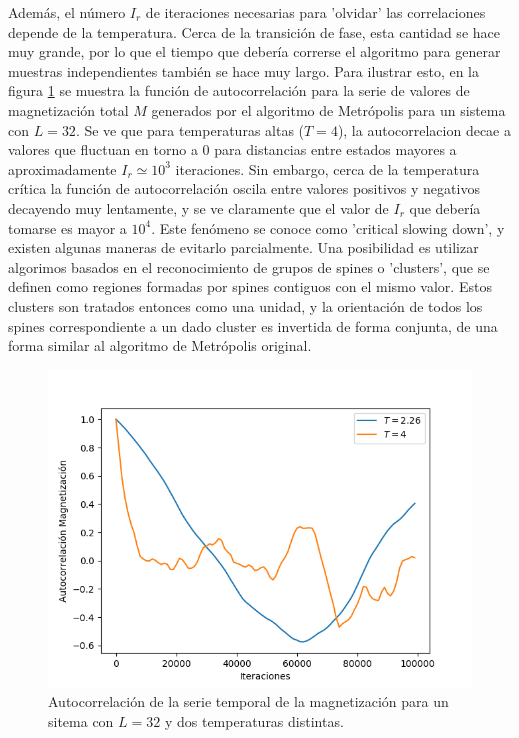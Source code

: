 \documentclass[a4paper,11pt,oneside]{article}
\begin{document}
Además, el número $I_r$ de iteraciones necesarias para 'olvidar' las
correlaciones depende de la temperatura. Cerca de la transición de fase, esta
cantidad se hace muy grande, por lo que el tiempo que debería correrse el
algoritmo para generar muestras independientes también se hace muy largo.
Para ilustrar esto, en la figura
\ref{fig:autocorr_mag} se muestra la función de autocorrelación para la serie
de valores de magnetización total $M$ generados por el algoritmo de Metrópolis
para un sistema con $L=32$.
Se ve que para temperaturas altas ($T=4$), la autocorrelacion decae a valores que
fluctuan en torno a $0$ para distancias entre estados mayores a aproximadamente
$I_r \simeq 10^3$ iteraciones. Sin embargo, 
cerca de la temperatura crítica la función de
autocorrelación oscila entre valores positivos y negativos decayendo muy
lentamente, y se ve claramente que el valor de $I_r$ que debería tomarse 
es mayor a $10^4$. Este fenómeno se conoce como 'critical slowing down', y
existen algunas maneras de evitarlo parcialmente. Una posibilidad es utilizar
algorimos basados en el reconocimiento de grupos de spines o 'clusters', que se
definen como regiones formadas por spines contiguos con el mismo valor. Estos
clusters son tratados entonces como una unidad, y la orientación de todos los 
spines correspondiente a un dado cluster 
es invertida de forma conjunta, 
de una forma similar al algoritmo de Metrópolis original.
\begin{figure}
\centering
\includegraphics[scale=.6]{./figuras/autocorr_mag.png}
\caption{Autocorrelación de la serie temporal de la magnetización para un
    sitema con $L=32$ y dos temperaturas distintas. \label{fig:autocorr_mag}}
\end{figure}
\end{document}
